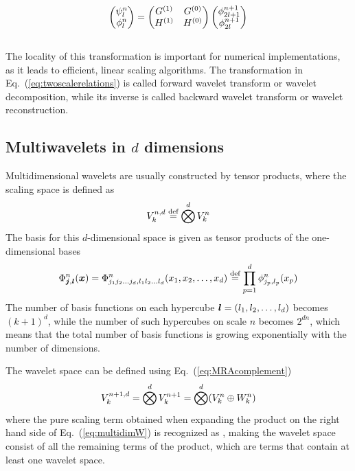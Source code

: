\begin{equation}
    \label{eq:twoscalerelations}
    \begin{pmatrix}
	\psi_{l}^{n}\\
	\phi_{l}^{n}\\
    \end{pmatrix}=
    \begin{pmatrix}
	G^{(1)}&G^{(0)}\\
	H^{(1)}&H^{(0)}\\
    \end{pmatrix}
    \begin{pmatrix}
	\phi_{2l+1}^{n+1}\\
	\phi_{2l}^{n+1}\\
    \end{pmatrix}
\end{equation}
\\
\noindent
The locality of this transformation is important for numerical implementations,
as it leads to efficient, linear scaling algorithms. The transformation in 
Eq.~(\ref{eq:twoscalerelations}) is called forward wavelet transform or 
wavelet decomposition, while its inverse is called backward wavelet transform
or wavelet reconstruction.

\subsection{Multiwavelets in $d$ dimensions}
Multidimensional wavelets are usually constructed by tensor products, where the
scaling space is defined as
\begin{equation}
    {V}_{k}^{n,d} \stackrel{\text{def}}{\hbox{=}} \bigotimes^d {V}_{k}^{n}
\end{equation}
The basis for this $d$-dimensional space is given as tensor products of the
one-dimensional bases
\begin{equation}
    \label{eq:multidimscaling}
    \Phi^n_{\boldsymbol j,\boldsymbol l}(\boldsymbol x) = 
    \Phi^n_{j_1 j_2\dots j_d,l_1 l_2\dots l_d} (x_1,x_2,\dots,x_d) \stackrel{\text{def}}{\hbox{=}}
    \prod_{p=1}^d \phi^n_{j_p,l_p}(x_p)
\end{equation}
The number of basis functions on each hypercube $\boldsymbol l=(l_1,l_2,\dots,l_d)$ 
becomes $(k+1)^d$, while the number of such hypercubes on scale $n$ becomes $2^{dn}$, 
which means that the total number of basis functions is growing exponentially 
with the number of dimensions.

The wavelet space can be defined using Eq.~(\ref{eq:MRAcomplement})
\begin{equation}
    \label{eq:multidimW}
    {V}_{k}^{n+1,d} = \bigotimes^d {V}_{k}^{n+1} = 
	\bigotimes^d ({V}_{k}^{n} \oplus {W}_{k}^{n})
\end{equation}
where the pure scaling term obtained when expanding the product on the right
hand side of Eq.~(\ref{eq:multidimW}) is recognized as , making the
wavelet space  consist of all the remaining terms of the product, 
which are terms that contain at least one wavelet space.

